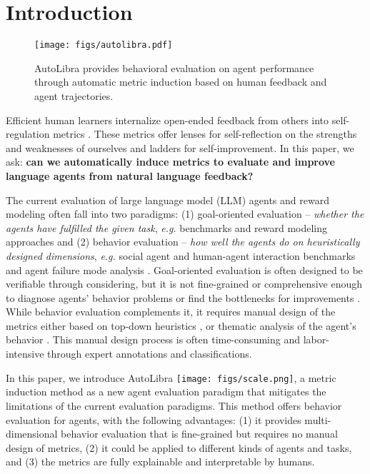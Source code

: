 \section{Introduction}

\begin{wrapfigure}[18]{r}{0.45\textwidth}
   \vspace{-40pt}
   \centering
   \texttt{[image: figs/autolibra.pdf]}
   \caption{AutoLibra provides behavioral evaluation on agent performance
    through automatic metric induction based on human feedback and agent trajectories.}
\end{wrapfigure}


Efficient human learners internalize open-ended feedback from others into self-regulation metrics
\citep{pintrich2002development,nicol2006formative}.
These metrics offer lenses for self-reflection on the
strengths and weaknesses of ourselves and ladders for self-improvement.
In this paper, we ask:
\textbf{can we automatically induce metrics to evaluate and improve language agents from natural language feedback?} 

   
The current evaluation of large language model (LLM) agents and reward modeling often fall
into two paradigms: (1) goal-oriented evaluation --
\emph{whether the agents have fulfilled the given task},
\emph{e.g.} benchmarks \citep{zhouwebarena,jimenezswe,chan2024mle,paglieri2024balrog} and reward
modeling approaches \citep{pan2024autonomous,chen2025scaling,choudhury2025process}
and (2) behavior evaluation -- \emph{how well the agents do on heuristically designed dimensions},
\emph{e.g.} social agent and human-agent interaction benchmarks \citep{zhousotopia,shao2024collaborative}
and agent failure mode analysis \citep{pan2025why,zhang2023effects,yang2023behavioral}. 
Goal-oriented evaluation is often designed to be verifiable through considering, but it is not fine-grained
or comprehensive enough to diagnose agents' behavior problems or find the bottlenecks for improvements \citep{yehudai2025survey}.  
While behavior evaluation complements it, it requires manual design of the metrics either based on top-down heuristics
\citep{zhousotopia}, or thematic analysis of the agent's behavior \citep{shao2024collaborative,pan2025why}.
This manual design process is often time-consuming and labor-intensive through expert annotations and classifications. 

In this paper, we introduce AutoLibra \protect\texttt{[image: figs/scale.png]},
a metric induction method as a new agent evaluation paradigm 
that mitigates the limitations of the current evaluation paradigms.
This method offers behavior evaluation for agents, with the following advantages:
(1) it provides multi-dimensional behavior evaluation that is fine-grained but requires no manual design of metrics,
(2) it could be applied to different kinds of agents and tasks, and 
(3) the metrics are fully explainable and interpretable by humans.

